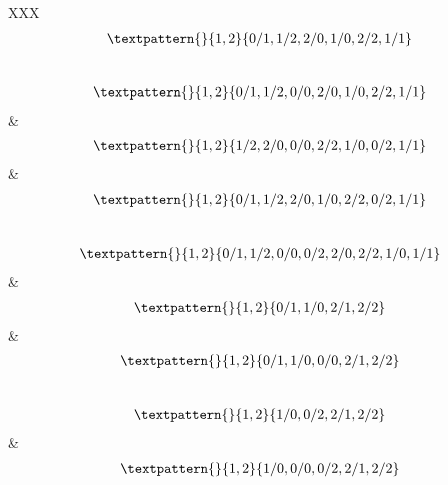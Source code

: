 \begin{center}
\begin{longtabu}[l]{XXX}
\begin{equation}
	\begin{gathered}
		\textpattern{}{1,2}{0/1,1/2,2/0,1/0,2/2,1/1}
	\end{gathered}
	\label{cls:142}
\end{equation}
\\
\begin{equation}
	\begin{gathered}
		\textpattern{}{1,2}{0/1,1/2,0/0,2/0,1/0,2/2,1/1}
	\end{gathered}
	\label{cls:143}
\end{equation}
    &
\begin{equation}
	\begin{gathered}
		\textpattern{}{1,2}{1/2,2/0,0/0,2/2,1/0,0/2,1/1}
	\end{gathered}
	\label{cls:144}
\end{equation}
    &
\begin{equation}
	\begin{gathered}
		\textpattern{}{1,2}{0/1,1/2,2/0,1/0,2/2,0/2,1/1}
	\end{gathered}
	\label{cls:145}
\end{equation}
\\
\begin{equation}
	\begin{gathered}
		\textpattern{}{1,2}{0/1,1/2,0/0,0/2,2/0,2/2,1/0,1/1}
	\end{gathered}
	\label{cls:146}
\end{equation}
    &
\begin{equation}
	\begin{gathered}
		\textpattern{}{1,2}{0/1,1/0,2/1,2/2}
	\end{gathered}
	\label{cls:147}
\end{equation}
    &
\begin{equation}
	\begin{gathered}
		\textpattern{}{1,2}{0/1,1/0,0/0,2/1,2/2}
	\end{gathered}
	\label{cls:148}
\end{equation}
\\
\begin{equation}
	\begin{gathered}
		\textpattern{}{1,2}{1/0,0/2,2/1,2/2}
	\end{gathered}
	\label{cls:149}
\end{equation}
&
\begin{equation}
	\begin{gathered}
		\textpattern{}{1,2}{1/0,0/0,0/2,2/1,2/2}
	\end{gathered}

\end{equation}
\end{longtabu}
\end{center}
